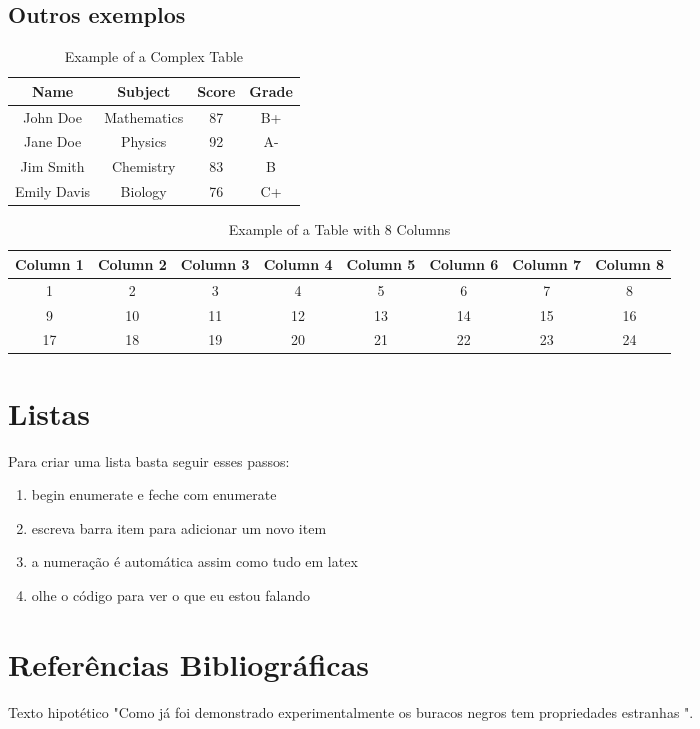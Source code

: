 \documentclass[a4paper]{article}
\begin{document}
\subsection{Outros exemplos}
\begin{table}[h]
\centering
\caption{Example of a Complex Table}
\label{tab:complex_table}
\begin{tabular}{|c|c|c|c|}
\hline
\textbf{Name} & \textbf{Subject} & \textbf{Score} & \textbf{Grade} \\ \hline
John Doe & Mathematics & 87 & B+ \\ \hline
Jane Doe & Physics & 92 & A- \\ \hline
Jim Smith & Chemistry & 83 & B \\ \hline
Emily Davis & Biology & 76 & C+ \\ \hline
\end{tabular}
\end{table}


\begin{table}[h]
\centering
\caption{Example of a Table with 8 Columns}
\label{tab:table_with_8_columns}
\begin{tabular}{|c|c|c|c|c|c|c|c|}
\hline
\textbf{Column 1} & \textbf{Column 2} & \textbf{Column 3} & \textbf{Column 4} & \textbf{Column 5} & \textbf{Column 6} & \textbf{Column 7} & \textbf{Column 8} \\ \hline
1 & 2 & 3 & 4 & 5 & 6 & 7 & 8 \\ \hline
9 & 10 & 11 & 12 & 13 & 14 & 15 & 16 \\ \hline
17 & 18 & 19 & 20 & 21 & 22 & 23 & 24 \\ \hline
\end{tabular}
\end{table}
\section{Listas}
Para criar uma lista basta seguir esses passos:
\begin{enumerate}
    \item begin enumerate e feche com enumerate
    \item escreva barra item para adicionar um novo item
    \item a numeração é automática assim como tudo em latex
    \item olhe o código para ver o que eu estou falando
\end{enumerate}
\section{Referências Bibliográficas}
Texto hipotético "Como já foi demonstrado experimentalmente
\cite{chartas_measuring_2017}
os buracos negros tem propriedades estranhas \cite{lasota_extracting_2014}". 
\end{document}
